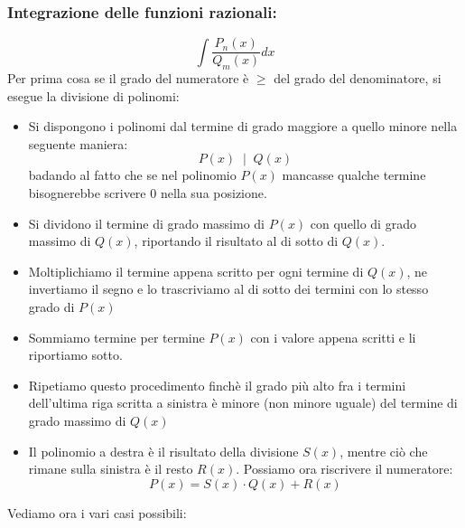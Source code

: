 \documentclass[a4paper, 9pt]{report}
\begin{document}
\subsubsection*{Integrazione delle funzioni razionali:}
\[
    \int \frac{P_n(x)}{Q_m(x)} dx
\]
Per prima cosa se il grado del numeratore è $\geq$ del grado del denominatore, si esegue la divisione di polinomi:
\begin{itemize}
    \item Si dispongono i polinomi dal termine di grado maggiore a quello minore nella seguente maniera:
    \[
        P(x) \;\; | \;\; Q(x)    
    \]
    badando al fatto che se nel polinomio $P(x)$ mancasse qualche termine bisognerebbe scrivere $0$ nella sua posizione.
    \item Si dividono il termine di grado massimo di $P(x)$ con quello di grado massimo di $Q(x)$, riportando il risultato al di sotto di $Q(x)$.
    \item Moltiplichiamo il termine appena scritto per ogni termine di $Q(x)$, ne invertiamo il segno e lo trascriviamo al di sotto dei termini con lo stesso grado di $P(x)$
    \item Sommiamo termine per termine $P(x)$ con i valore appena scritti e li riportiamo sotto.
    \item Ripetiamo questo procedimento finchè il grado più alto fra i termini dell'ultima riga scritta a sinistra è minore (non minore uguale) del termine di grado massimo di $Q(x)$
    \item Il polinomio a destra è il risultato della divisione $S(x)$, mentre ciò che rimane sulla sinistra è il resto $R(x)$. Possiamo ora riscrivere il numeratore:
    \[
        P(x) = S(x) \cdot Q(x) + R(x)
    \]
\end{itemize}
Vediamo ora i vari casi possibili:
\end{document}
